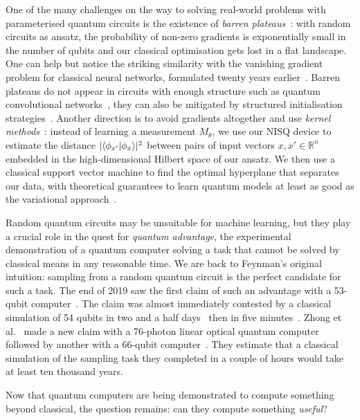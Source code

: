 One of the many challenges on the way to solving real-world problems with parameterised quantum circuits is the existence of \emph{barren plateaus}~\cite{McCleanEtAl18}:
with random circuits as ansatz, the probability of non-zero gradients is exponentially small in the number of qubits and our classical optimisation gets lost in a flat landscape.
One can help but notice the striking similarity with the vanishing gradient
problem for classical neural networks, formulated twenty years earlier~\cite{Hochreiter98}.
Barren plateaus do not appear in circuits with enough structure such as quantum convolutional networks~\cite{PesahEtAl21}, they can also be mitigated by structured initialisation strategies~\cite{GrantEtAl19}.
Another direction is to avoid gradients altogether and use \emph{kernel methods}~\cite{SchuldKilloran19}:
instead of learning a measurement $M_\theta$, we use our NISQ device to estimate the distance $|\langle\phi_{x'}|\phi_x\rangle|^2$ between pairs of input vectors $x, x' \in \mathbb{R}^n$ embedded in the high-dimensional Hilbert space of our ansatz.
We then use a classical support vector machine to find the optimal hyperplane that separates our data, with theoretical guarantees to learn quantum models at least as good as the variational approach~\cite{Schuld21}.

Random quantum circuits may be unsuitable for machine learning, but they play a crucial role in the quest for \emph{quantum advantage}, the experimental demonstration of a quantum computer solving a task that cannot be solved by classical means in any reasonable time.
We are back to Feynman's original intuition: sampling from a random quantum circuit is the perfect candidate for such a task.
The end of 2019 saw the first claim of such an advantage with a 53-qubit computer~\cite{AruteEtAl19}.
The claim was almost immediately contested by a classical simulation of 54 qubits in two and a half days~\cite{PednaultEtAl19} then in five minutes~\cite{YongEtAl21}.
Zhong et al.~\cite{ZhongEtAl20a} made a new claim with a 76-photon linear optical quantum computer followed by another with a 66-qubit computer~\cite{WuEtAl21,ZhuEtAl21}.
They estimate that a classical simulation of the sampling task they completed in a couple of hours would take at least ten thousand years.

Now that quantum computers are being demonstrated to compute something beyond classical, the question remains: can they compute something \emph{useful}?
